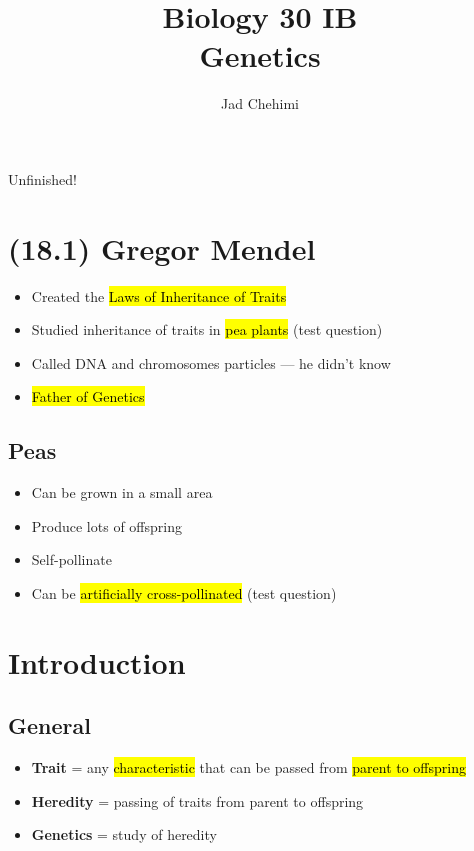 \documentclass[a4paper,12pt]{article}
\title{Biology 30 IB \\ Genetics}
\author{Jad Chehimi}
\begin{document}
\maketitle

\begin{center}
\Huge
Unfinished!
\normalsize
\end{center}

\tableofcontents

\pagebreak

\section{(18.1) Gregor Mendel}
\begin{itemize}
    \item{Created the \hl{Laws of Inheritance of Traits}}
    \item{Studied inheritance of traits in \hl{pea plants} (test question)}
    \item{Called DNA and chromosomes particles --- he didn't know}
    \item{\hl{Father of Genetics}}
\end{itemize}

\subsection{Peas}
\begin{itemize}
    \item{Can be grown in a small area}
    \item{Produce lots of offspring}
    \item{Self-pollinate}
    \item{Can be \hl{artificially cross-pollinated} (test question)}
\end{itemize}

\section{Introduction}
\subsection{General}
\begin{itemize}
    \item{\textbf{Trait} = any \hl{characteristic} that can be passed from \hl{parent to offspring}}
    \item{\textbf{Heredity} = passing of traits from parent to offspring}
    \item{\textbf{Genetics} = study of heredity}
\end{itemize}
\end{document}
